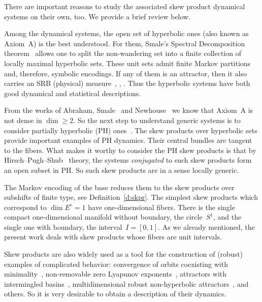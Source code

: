 \documentclass[a4paper,12pt]{amsart}
\begin{document}
There are important reasons to study the associated skew product dynamical systems on their own, too. We provide a brief review below.

Among the dynamical systems, the open set of hyperbolic ones (also known as Axiom~A) is the best understood. For them, Smale's Spectral Decomposition theorem~\cite{Smale1967a} allows one to split the non-wandering set into a finite collection of locally maximal hyperbolic sets. These unit sets admit finite Markov partitions and, therefore, symbolic encodings. If any of them is an attractor, then it also carries an SRB (physical) measure~\cite{Sinai1972}, \cite{Ruelle1976}, \cite{Bowen2008}. Thus the hyperbolic systems have both good dynamical and statistical descriptions.

From the works of Abraham, Smale~\cite{Abraham1970} and Newhouse~\cite{Newhouse1974} we know that Axiom~A is not dense in $\dim \ge 2$. So the next step to understand generic systems is to consider partially hyperbolic (PH) ones~\cite{Hasselblatt2006}. The skew products over hyperbolic sets provide important examples of PH dynamics. Their central bundles are
tangent to the fibers.
What makes it worthy to consider the PH skew products is that by Hirsch--Pugh--Shub~\cite{HPS1977} theory, the systems \emph{conjugated} to such skew products form an open subset in PH. So such skew products are in a sense locally generic.

The Markov encoding of the base reduces them to the skew products over subshifts of finite type, see Definition~\ref{d:skpr}. The simplest skew products which correspond to $\dim E^c = 1$ have one-dimensional fibers. There is the single compact one-dimensional manifold without boundary, the circle~$S^1$, and the single one with boundary, the interval~$I = [0,1]$. As we already mentioned, the present work deals with skew products whose fibers are unit intervals.


Skew products are also widely used as a tool for the construction of (robust) examples of complicated behavior: convergence of orbits coexisting with minimality~\cite{Antonov1984, Kleptsyn2004}, non-removable zero Lyapunov exponents~\cite{GIKN2005}, attractors with intermingled basins~\cite{Kan1994, Bonifant2008, Ilyashenko2008}, multidimensional robust non-hyperbolic attractors~\cite{Viana1997}, and others. So it is very desirable to obtain a description of their dynamics.
\end{document}
